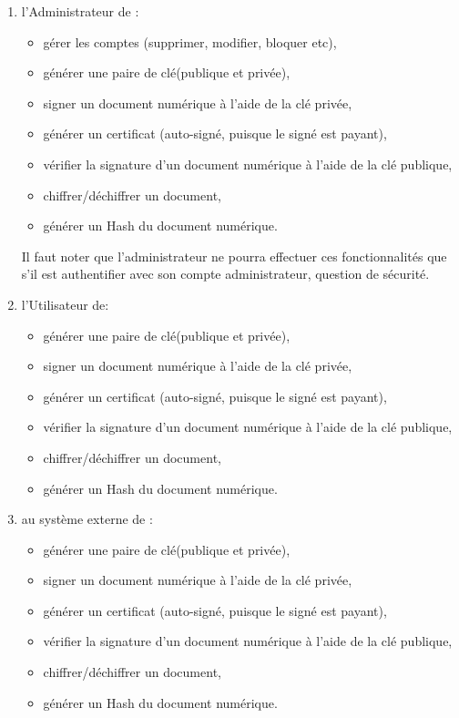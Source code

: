 			\begin{enumerate}
				\item l'Administrateur de :
					\begin{itemize}
						\item  gérer les comptes (supprimer, modifier, bloquer etc),
						\item  générer une paire de clé(publique et privée),
						\item  signer un document numérique à l’aide de la clé privée,
						\item  générer un certificat (auto-signé, puisque le signé est payant),
						\item  vérifier la signature d’un document numérique à l’aide de la clé publique,
						\item  chiffrer/déchiffrer un document,
						\item  générer un Hash du document numérique.
					\end{itemize}
					Il faut noter que l'administrateur ne pourra effectuer ces fonctionnalités que s'il est authentifier avec son compte administrateur, question de sécurité.
				\item l'Utilisateur de:
						\begin{itemize}
						\item  générer une paire de clé(publique et privée),
						\item  signer un document numérique à l’aide de la clé privée,
						\item  générer un certificat (auto-signé, puisque le signé est payant),
						\item  vérifier la signature d’un document numérique à l’aide de la clé publique,
						\item  chiffrer/déchiffrer un document,
						\item  générer un Hash du document numérique.
					\end{itemize}
				\item au système externe de :
						\begin{itemize}
						\item  générer une paire de clé(publique et privée),
						\item  signer un document numérique à l’aide de la clé privée,
						\item  générer un certificat (auto-signé, puisque le signé est payant),
						\item  vérifier la signature d’un document numérique à l’aide de la clé publique,
						\item  chiffrer/déchiffrer un document,
						\item  générer un Hash du document numérique.
					\end{itemize}
			\end{enumerate}
			
